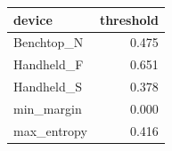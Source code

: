 \begin{tabular}{lr}
\toprule
device & threshold \\
\midrule
Benchtop_N & 0.475 \\
Handheld_F & 0.651 \\
Handheld_S & 0.378 \\
min_margin & 0.000 \\
max_entropy & 0.416 \\
\bottomrule
\end{tabular}
